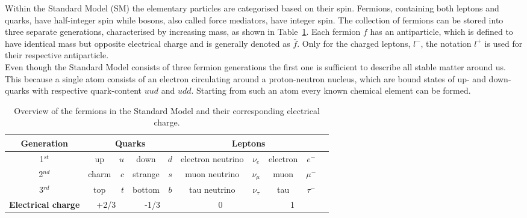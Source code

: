 Within the Standard Model (SM) the elementary particles are categorised based on their spin. Fermions, containing both leptons and quarks, have half-integer spin while bosons, also called force mediators, have integer spin. 
The collection of fermions can be stored into three separate generations, characterised by increasing mass, as shown in Table~\ref{table::ElemParticles}.  Each fermion $f$ has an antiparticle, which is defined to have identical mass but opposite electrical charge and is generally denoted as $\bar{f}$. 
Only for the charged leptons, $l^{-}$, the notation $l^{+}$ is used for their respective antiparticle.
\\
Even though the Standard Model consists of three fermion generations the first one is sufficient to describe all stable matter around us.
This because a single atom consists of an electron circulating around a proton-neutron nucleus, which are bound states of up- and down-quarks with respective quark-content $uud$ and $udd$. Starting from such an atom every known chemical element can be formed. 
\setlength\extrarowheight{5pt}
\begin{table}[h!t]
 \centering
 \caption{Overview of the fermions in the Standard Model and their corresponding electrical charge.} \label{table::ElemParticles}
 \begin{tabular}{|c|cr|cc|cc|cc|c|}
  \hline
  \textbf{Generation} 		& \multicolumn{4}{c|}{\textbf{Quarks}} 				& \multicolumn{4}{c|}{\textbf{Leptons}} 				\\
  \hline
  1$^{st}$ 			& up 		& $u$ 		& down 		& $d$ 		& electron neutrino	& $\nu_{e}$ 	& electron	& $e^{-}$ 	\\
  \hline
  2$^{nd}$ 			& charm 	& $c$ 		& strange 	& $s$		& muon neutrino		& $\nu_{\mu}$ 	& muon		& $\mu^{-}$ 	\\
  \hline
  3$^{rd}$ 			& top		& $t$ 		& bottom 	& $b$ 		& tau neutrino 		& $\nu_{\tau}$ 	& tau		& $\tau^{-}$ 	\\
  \hline
  \hline
  \textbf{Electrical charge} 	& \multicolumn{2}{c|}{+2/3} 	& \multicolumn{2}{c|}{-1/3} 	& \multicolumn{2}{c|}{0} 		& \multicolumn{2}{c|}{1}	\\
  \hline
 \end{tabular}
\end{table}

